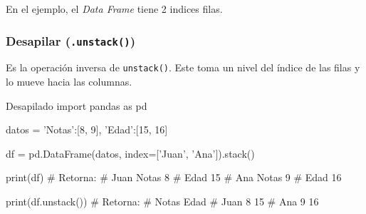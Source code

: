 En el ejemplo, el \textit{Data Frame} tiene 2 indices filas. 


\subsubsection{Desapilar (\texttt{.unstack()})}

Es la operación inversa de \texttt{unstack()}. Este toma un nivel del índice de las filas y lo mueve hacia las columnas.

\begin{pycode}{Desapilado}
import pandas as pd

datos = {
    'Notas':[8, 9],
    'Edad':[15, 16]
}

df = pd.DataFrame(datos, index=['Juan', 'Ana']).stack()

print(df) # Retorna:
# Juan  Notas     8
#       Edad     15
# Ana   Notas     9
#       Edad     16

print(df.unstack()) # Retorna:
#       Notas  Edad
# Juan      8    15
# Ana       9    16    
\end{pycode}
